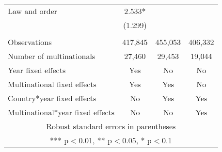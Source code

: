 \begin{longtable}{lccc}
\quad Law and order & 2.533* &  &  \\
 & (1.299) &  &  \\
 &  &  &  \\
Observations & 417,845 & 455,053 & 406,332 \\
Number of multinationals & 27,460 & 29,453 & 19,044 \\
Year fixed effects & Yes & No & No \\
Multinational fixed effects & Yes & Yes & No \\
Country*year fixed effects & No & Yes & Yes \\
 Multinational*year fixed effects & No & No & Yes \\ \hline
\multicolumn{4}{c}{ Robust standard errors in parentheses} \\
\multicolumn{4}{c}{ *** p$<$0.01, ** p$<$0.05, * p$<$0.1} \\
\end{longtable}

